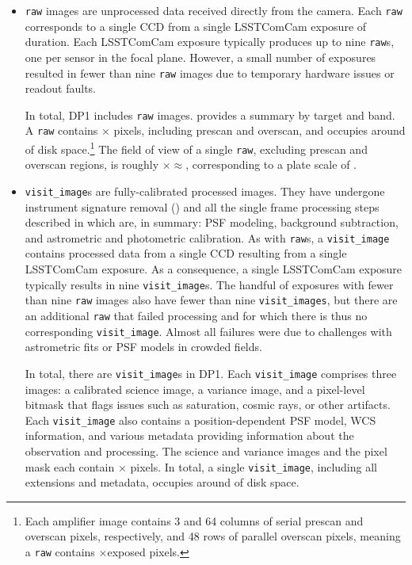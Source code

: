 \begin{itemize}
\item \texttt{raw} images \citep{10.71929/rubin/2570310} are unprocessed data received directly from the camera.
Each \texttt{raw} corresponds to a single \gls{CCD} from a single \gls{LSSTComCam} exposure of \exposuretime duration.
Each \gls{LSSTComCam} exposure typically produces up to nine \texttt{raw}s, one per sensor in the focal plane.
However, a small number of exposures resulted in fewer than nine \texttt{raw} images due to temporary hardware issues or readout faults.

In total, \gls{DP1} includes \nraws \texttt{raw} images.
 provides a summary by target and band.
A \texttt{raw} contains \nrawpixx $\times$ \nrawpixy pixels, including prescan and overscan, and occupies around \rawhdd of disk space.\footnote{Each amplifier image contains 3 and 64 columns of serial prescan and overscan pixels, respectively, and 48 rows of parallel overscan pixels, meaning a \texttt{raw} contains \nvisitimagepixx$\times$\nvisitimagepixy exposed pixels.}
The field of view of a single \texttt{raw}, excluding prescan and overscan regions, is roughly \visitimagefovx$\times$\visitimagefovy$\approx$\visitimagefov, corresponding to a plate scale of \rawplatescale.


\item \texttt{visit\_image}s \citep{10.71929/rubin/2570311} are fully-calibrated processed images.
They have undergone instrument signature removal () and all the single frame processing steps described in  which are, in summary: \gls{PSF} modeling, \gls{background} subtraction, and astrometric and photometric \gls{calibration}.
As with \texttt{raw}s, a \texttt{visit\_image} contains processed data from a single \gls{CCD} resulting from a single \exposuretime \gls{LSSTComCam} exposure.
As a consequence, a single \gls{LSSTComCam} exposure typically results in nine \texttt{visit\_image}s.
The handful of exposures with fewer than nine \texttt{raw} images also have fewer than nine \texttt{visit\_images}, but there are an additional \nsfpfails \texttt{raw} that failed processing and for which there is thus no corresponding \texttt{visit\_image}.
Almost all failures were due to challenges with astrometric fits or \gls{PSF} models in crowded fields.

In total, there are \nvisitimages \texttt{visit\_image}s in \gls{DP1}.
Each \texttt{visit\_image} comprises three images: a calibrated science image, a variance image, and a pixel-level bitmask that flags issues such as saturation, cosmic rays, or other artifacts. 
Each \texttt{visit\_image} also contains a position-dependent \gls{PSF} model, \gls{WCS} information, and various \gls{metadata} providing information about the observation and processing.
The science and variance images and the pixel mask each contain \nvisitimagepixx$\times$ \nvisitimagepixy pixels.
In total, a single \texttt{visit\_image}, including all extensions and \gls{metadata}, occupies around \visitimagehdd of disk space.


\end{itemize}
